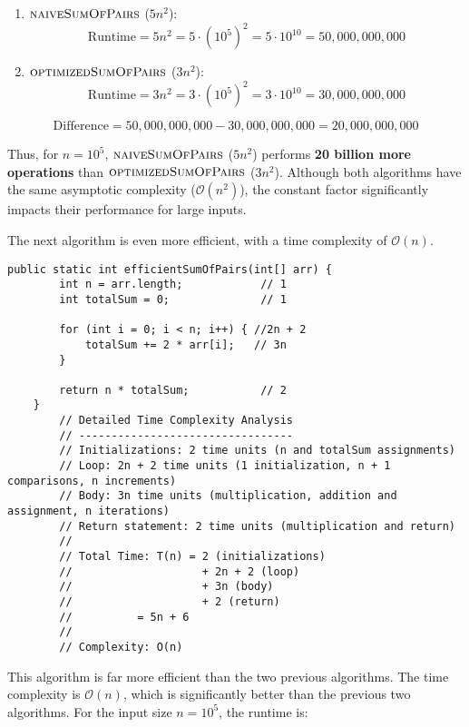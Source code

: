 \begin{enumerate}
    \item $\proc{naiveSumOfPairs}$ (\(5n^2\)):
    \[
    \text{Runtime} = 5n^2 = 5 \cdot (10^5)^2 = 5 \cdot 10^{10} = 50,000,000,000
    \]

    \item $\proc{optimizedSumOfPairs}$ (\(3n^2\)):
    \[
    \text{Runtime} = 3n^2 = 3 \cdot (10^5)^2 = 3 \cdot 10^{10} = 30,000,000,000
    \]
\end{enumerate}

\[
\text{Difference} = 50,000,000,000 - 30,000,000,000 = 20,000,000,000
\]

Thus, for \(n = 10^5\), $\proc{naiveSumOfPairs}$ (\(5n^2\)) performs \textbf{20 billion more operations} 
\newline than $\proc{optimizedSumOfPairs}$ (\(3n^2\)). Although both algorithms have the same asymptotic complexity (\(\mathcal{O}(n^2)\)), the constant factor significantly impacts their performance for large inputs.

The next algorithm is even more efficient, with a time complexity of $\mathcal{O}(n)$.
\begin{lstlisting}[style = javaStyle, caption={Efficient Sum of Pairs with Analysis}, label={lst:java_efficient_sum_pairs_analysis}]
    public static int efficientSumOfPairs(int[] arr) {
        int n = arr.length;            // 1
        int totalSum = 0;              // 1
    
        for (int i = 0; i < n; i++) { //2n + 2
            totalSum += 2 * arr[i];   // 3n
        }
    
        return n * totalSum;           // 2
    }
        // Detailed Time Complexity Analysis
        // ---------------------------------
        // Initializations: 2 time units (n and totalSum assignments)
        // Loop: 2n + 2 time units (1 initialization, n + 1 comparisons, n increments)
        // Body: 3n time units (multiplication, addition and assignment, n iterations)
        // Return statement: 2 time units (multiplication and return)
        //
        // Total Time: T(n) = 2 (initializations)
        //                    + 2n + 2 (loop)
        //                    + 3n (body)
        //                    + 2 (return)
        //          = 5n + 6
        //
        // Complexity: O(n)
\end{lstlisting}    

This algorithm is far more efficient than the two previous algorithms. The time complexity is $\mathcal{O}(n)$, which is significantly better than the previous two algorithms. For the input size \(n = 10^5\), the runtime is:


